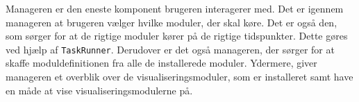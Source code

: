 Manageren er den eneste komponent brugeren interagerer med.
Det er igennem manageren at brugeren vælger hvilke moduler, der skal køre.
Det er også den, som sørger for at de rigtige moduler kører på de rigtige tidspunkter.
Dette gøres ved hjælp af \texttt{TaskRunner}.
Derudover er det også manageren, der sørger for at skaffe moduldefinitionen fra alle de installerede moduler.
Ydermere, giver manageren et overblik over de visualiseringsmoduler, som er installeret samt have en måde at vise visualiseringsmodulerne på.